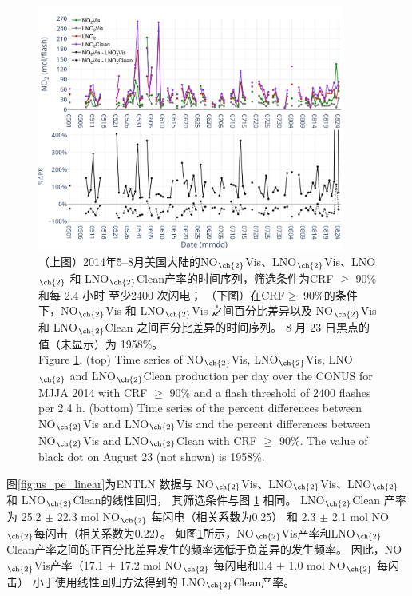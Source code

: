 \begin{figure}[H]
\centering
\includegraphics[width=0.9\textwidth]{./figures/us_pe_timeseries.png}
\caption{（上图）2014年5--8月美国大陆的NO$_{\ch{2}}$Vis、LNO$_{\ch{2}}$Vis、LNO$_{\ch{2}}$ 和 LNO$_{\ch{2}}$Clean产率的时间序列，筛选条件为CRF $\geq$ 90\% 和每 2.4 小时 至少2400 次闪电；
（下图）在CRF$\geq$ 90\%的条件下，NO$_{\ch{2}}$Vis 和 LNO$_{\ch{2}}$Vis 之间百分比差异以及 NO$_{\ch{2}}$Vis 和 LNO$_{\ch{2}}$Clean 之间百分比差异的时间序列。
8 月 23 日黑点的值（未显示）为 1958\%。\\
Figure \ref{fig:us_pe_timeseries}. (top) Time series of NO$_{\ch{2}}$Vis, LNO$_{\ch{2}}$Vis, LNO$_{\ch{2}}$ and LNO$_{\ch{2}}$Clean production per day over the CONUS for MJJA 2014 with CRF $\geq$ 90\% and a flash threshold of 2400 flashes per 2.4 h.
(bottom) Time series of the percent differences between NO$_{\ch{2}}$Vis and LNO$_{\ch{2}}$Vis and the percent differences between NO$_{\ch{2}}$Vis and LNO$_{\ch{2}}$Clean with CRF $\geq$ 90\%.
The value of black dot on August 23 (not shown) is 1958\%.}
\label{fig:us_pe_timeseries}
\end{figure}


图\ref{fig:us_pe_linear}为ENTLN 数据与 NO$_{\ch{2}}$Vis、LNO$_{\ch{2}}$Vis、LNO$_{\ch{2}}$ 和 LNO$_{\ch{2}}$Clean的线性回归，
其筛选条件与图 \ref{fig:us_pe_timeseries} 相同。
LNO$_{\ch{2}}$Clean 产率为 25.2 $\pm$ 22.3 mol NO$_{\ch{2}}$ 每闪电（相关系数为0.25）
和 2.3 $\pm$ 2.1 mol NO$_{\ch{2}}$每闪击（相关系数为0.22）。
如图\ref{fig:us_pe_timeseries}所示，NO$_{\ch{2}}$Vis产率和LNO$_{\ch{2}}$Clean产率之间的正百分比差异发生的频率远低于负差异的发生频率。
因此，NO$_{\ch{2}}$Vis产率（17.1 $\pm$ 17.2 mol NO$_{\ch{2}}$ 每闪电和0.4 $\pm$ 1.0 mol NO$_{\ch{2}}$ 每闪击）
小于使用线性回归方法得到的 LNO$_{\ch{2}}$Clean产率。


